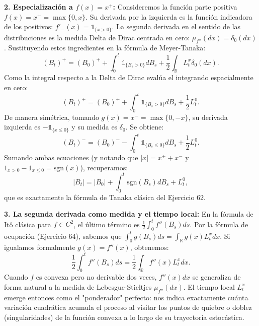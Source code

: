 \documentclass[11pt, letterpaper]{article}
\begin{document}
\begin{solucion}
    \textbf{2. Especialización a $f(x) = x^+$:}
    Consideremos la función parte positiva $f(x) = x^+ = \max\{0, x\}$.
    Su derivada por la izquierda es la función indicadora de los positivos: $f'_-(x) = \mathbb{1}_{\{x > 0\}}$.
    La segunda derivada en el sentido de las distribuciones es la medida Delta de Dirac centrada en cero: $\mu_{f''}(dx) = \delta_0(dx)$.
    Sustituyendo estos ingredientes en la fórmula de Meyer-Tanaka:
    \[ (B_t)^+ = (B_0)^+ + \int_0^t \mathbb{1}_{\{B_s > 0\}} dB_s + \frac{1}{2} \int_{\mathbb{R}} L_t^x \delta_0(dx). \]
    Como la integral respecto a la Delta de Dirac evalúa el integrando espacialmente en cero:
    \[ (B_t)^+ = (B_0)^+ + \int_0^t \mathbb{1}_{\{B_s > 0\}} dB_s + \frac{1}{2} L_t^0. \]
    De manera simétrica, tomando $g(x) = x^- = \max\{0, -x\}$, su derivada izquierda es $-\mathbb{1}_{\{x \le 0\}}$ y su medida es $\delta_0$. Se obtiene:
    \[ (B_t)^- = (B_0)^- - \int_0^t \mathbb{1}_{\{B_s \le 0\}} dB_s + \frac{1}{2} L_t^0. \]
    Sumando ambas ecuaciones (y notando que $|x| = x^+ + x^-$ y $1_{x>0} - 1_{x \le 0} = \text{sgn}(x)$), recuperamos:
    \[ |B_t| = |B_0| + \int_0^t \text{sgn}(B_s) dB_s + L_t^0, \]
    que es exactamente la fórmula de Tanaka clásica del Ejercicio 62.

    \textbf{3. La segunda derivada como medida y el tiempo local:}
    En la fórmula de Itô clásica para $f \in C^2$, el último término es $\frac{1}{2} \int_0^t f''(B_s) ds$.
    Por la fórmula de ocupación (Ejercicio 64), sabemos que $\int_0^t g(B_s) ds = \int_{\mathbb{R}} g(x) L_t^x dx$. Si igualamos formalmente $g(x) = f''(x)$, obtenemos:
    \[ \frac{1}{2} \int_0^t f''(B_s) ds = \frac{1}{2} \int_{\mathbb{R}} f''(x) L_t^x dx. \]
    Cuando $f$ es convexa pero no derivable dos veces, $f''(x)dx$ se generaliza de forma natural a la medida de Lebesgue-Stieltjes $\mu_{f''}(dx)$. El tiempo local $L_t^x$ emerge entonces como el "ponderador" perfecto: nos indica exactamente cuánta variación cuadrática acumula el proceso al visitar los puntos de quiebre o doblez (singularidades) de la función convexa a lo largo de su trayectoria estocástica.
\end{solucion}

\newpage
\end{document}
